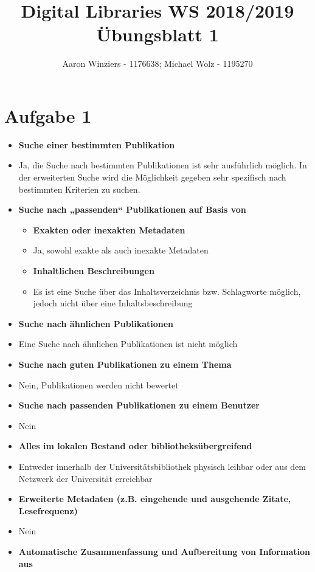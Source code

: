 \documentclass[11pt,a4paper,parskip=half ]{scrartcl}
\author{Aaron Winziers - 1176638; Michael Wolz - 1195270}
\title{Digital Libraries WS 2018/2019\\\LARGE{Übungsblatt 1}}
\begin{document}
	\maketitle
	
	\section*{Aufgabe 1}
	
	\begin{itemize}
		\item \textbf{Suche einer bestimmten Publikation}
		\item[] Ja, die Suche nach bestimmten Publikationen ist sehr ausführlich möglich. In der erweiterten Suche wird die Möglichkeit gegeben sehr spezifisch nach bestimmten Kriterien zu suchen. 
		\item \textbf{Suche nach „passenden“ Publikationen auf Basis von}
		\begin{itemize}
			\item \textbf{Exakten oder inexakten Metadaten}
			\item[] Ja, sowohl exakte als auch inexakte Metadaten
			\item \textbf{Inhaltlichen Beschreibungen}
			\item[]  Es ist eine Suche über das Inhaltsverzeichnis bzw. Schlagworte möglich, jedoch nicht über eine Inhaltsbeschreibung
		\end{itemize}
		\item \textbf{Suche nach ähnlichen Publikationen}
		\item[] Eine Suche nach ähnlichen Publikationen ist nicht möglich
		\item \textbf{Suche nach \glqq{}guten\grqq{} Publikationen zu einem Thema}
		\item[] Nein, Publikationen werden nicht bewertet
		\item \textbf{Suche nach \glqq{}passenden\grqq{} Publikationen zu einem Benutzer}
		\item[] Nein
		\item \textbf{Alles im lokalen Bestand oder bibliotheksübergreifend}
		\item[] Entweder innerhalb der Universitätsbibliothek physisch leihbar oder aus dem Netzwerk der Universität erreichbar
		\item \textbf{Erweiterte Metadaten (z.B. eingehende und ausgehende Zitate, Lesefrequenz)}
		\item[] Nein
		\item \textbf{Automatische Zusammenfassung und Aufbereitung von Information aus
}
\end{itemize}
\end{document}
